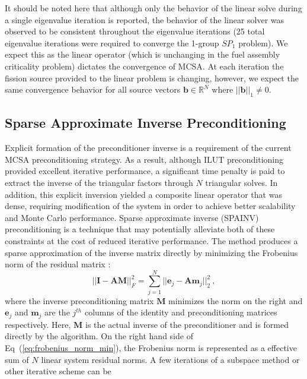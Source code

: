 It should be noted here that although only the behavior of the linear
solve during a single eigenvalue iteration is reported, the behavior
of the linear solver was observed to be consistent throughout the
eigenvalue iterations (25 total eigenvalue iterations were required to
converge the 1-group $SP_1$ problem). We expect this as the linear
operator (which is unchanging in the fuel assembly criticality
problem) dictates the convergence of MCSA. At each iteration the
fission source provided to the linear problem is changing, however, we
expect the same convergence behavior for all source vectors
$\mathbf{b} \in \mathbb{R}^{N}$ where $||\mathbf{b}||_1 \neq 0$.

\clearpage

\subsection{Sparse Approximate Inverse Preconditioning}
\label{subsec:spn_spainv_preconditioning}
Explicit formation of the preconditioner inverse is a requirement of
the current MCSA preconditioning strategy. As a result, although ILUT
preconditioning provided excellent iterative performance, a
significant time penalty is paid to extract the inverse of the
triangular factors through $N$ triangular solves. In addition, this
explicit inversion yielded a composite linear operator that was dense,
requiring modification of the system in order to achieve better
scalability and Monte Carlo performance. Sparse approximate inverse
(SPAINV) preconditioning is a technique that may potentially alleviate
both of these constraints at the cost of reduced iterative
performance. The method produces a sparse approximation of the inverse
matrix directly by minimizing the Frobenius norm of the residual
matrix \citep{saad_iterative_2003}:
\begin{equation}
  || \mathbf{I} - \mathbf{A} \mathbf{M} ||^2_F =
  \sum_{j=1}^N ||\mathbf{e}_j - \mathbf{A} \mathbf{m}_j||^2_2 \:,
  \label{eq:frobenius_norm_min}
\end{equation}
where the inverse preconditioning matrix $\mathbf{M}$ minimizes the
norm on the right and $\mathbf{e}_j$ and $\mathbf{m}_j$ are the
$j^{th}$ columns of the identity and preconditioning matrices
respectively. Here, $\mathbf{M}$ is the actual inverse of the
preconditioner and is formed directly by the algorithm. On the right
hand side of Eq~(\ref{eq:frobenius_norm_min}), the Frobenius norm is
represented as a effective sum of $N$ linear system residual norms. A
few iterations of a subspace method or other iterative scheme can be
